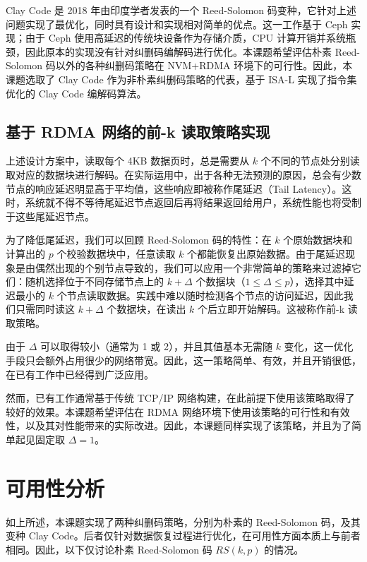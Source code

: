 Clay Code\cite{claycode2018} 是 2018 年由印度学者发表的一个 Reed-Solomon 码变种，它针对上述问题实现了最优化，同时具有设计和实现相对简单的优点。这一工作基于 Ceph 实现；由于 Ceph 使用高延迟的传统块设备作为存储介质，CPU 计算开销并系统瓶颈，因此原本的实现没有针对纠删码编解码进行优化。本课题希望评估朴素 Reed-Solomon 码以外的各种纠删码策略在 NVM+RDMA 环境下的可行性。因此，本课题选取了 Clay Code 作为非朴素纠删码策略的代表，基于 ISA-L 实现了指令集优化的 Clay Code 编解码算法。

\subsection{基于 RDMA 网络的前-k 读取策略实现}
\label{subsec:ch3_first_k}

上述设计方案中，读取每个 4KB 数据页时，总是需要从 $k$ 个不同的节点处分别读取对应的数据块进行解码。在实际运用中，出于各种无法预测的原因，总会有少数节点的响应延迟明显高于平均值，这些响应即被称作尾延迟（Tail Latency）。这时，系统就不得不等待尾延迟节点返回后再将结果返回给用户，系统性能也将受制于这些尾延迟节点。

为了降低尾延迟，我们可以回顾 Reed-Solomon 码的特性：在 $k$ 个原始数据块和计算出的 $p$ 个校验数据块中，任意读取 $k$ 个都能恢复出原始数据。由于尾延迟现象是由偶然出现的个别节点导致的，我们可以应用一个非常简单的策略来过滤掉它们：随机选择位于不同存储节点上的 $k + \Delta$ 个数据块（$1 \leq \Delta \leq p$），选择其中延迟最小的 $k$ 个节点读取数据。实践中难以随时检测各个节点的访问延迟，因此我们只需同时读这 $k + \Delta$ 个数据块，在读出 $k$ 个后立即开始解码。这被称作前-k 读取策略。

由于 $\Delta$ 可以取得较小（通常为 1 或 2），并且其值基本无需随 $k$ 变化，这一优化手段只会额外占用很少的网络带宽。因此，这一策略简单、有效，并且开销很低，在已有工作中已经得到广泛应用\cite{distcache2019,infinicache2020,hydra2019}。

然而，已有工作通常基于传统 TCP/IP 网络构建，在此前提下使用该策略取得了较好的效果。本课题希望评估在 RDMA 网络环境下使用该策略的可行性和有效性，以及其对性能带来的实际改进。因此，本课题同样实现了该策略，并且为了简单起见固定取 $\Delta = 1$。

\section{可用性分析}
\label{sec:ch3_avail}

如上所述，本课题实现了两种纠删码策略，分别为朴素的 Reed-Solomon 码，及其变种 Clay Code。后者仅针对数据恢复过程进行优化，在可用性方面本质上与前者相同。因此，以下仅讨论朴素 Reed-Solomon 码 $RS(k, p)$ 的情况。

